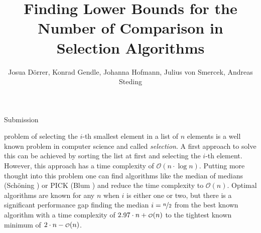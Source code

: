 \documentclass[10pt,journal,compsoc]{IEEEtran}
\newcommand\smallO{
  \mathchoice
    {{\scriptstyle\mathcal{O}}}%
    {{\scriptstyle\mathcal{O}}}%
    {{\scriptscriptstyle\mathcal{O}}}%
    {\scalebox{.50}{$\scriptscriptstyle\mathcal{O}$}}%
  }
\begin{document}
\title{Finding Lower Bounds for the Number of Comparison in Selection Algorithms}

\author{Josua Dörrer, Konrad Gendle, Johanna Hofmann, Julius von Smercek, Andreas Steding%
  }

%
{Submission}



\maketitle

\IEEEdisplaynontitleabstractindextext


\IEEEpeerreviewmaketitle

  problem of selecting the $i$-th smallest element in a list of $n$ elements is
a well known problem in computer science and called \textit{selection}. A first approach to solve
this can be achieved by sorting the list at first and selecting the $i$-th element. However, this
approach has a time complexity of $\mathcal{O}(n \cdot \log n)$. Putting more thought into this
problem one can find algorithms like the median of medians (Schöning \cite{Schoening1993}) or PICK
(Blum \cite{Blum1972}) and reduce the time complexity to $\mathcal{O}(n)$. Optimal algorithms are
known for any $n$ when $i$ is either one or two, but there is a significant performance gap finding
the median $i = \nicefrac{n}{2}$ from the best known algorithm with a time complexity of $2.97 \cdot
  n + \smallO(n)$ to the tightest known minimum of $2 \cdot n - \smallO(n)$.
\end{document}
